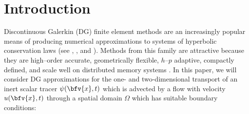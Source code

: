 \documentclass{ametsoc}
\begin{document}

\section{Introduction} \label{sec:intro}
Discontinuous Galerkin (DG) finite element methods are an increasingly popular means of producing numerical approximations to systems of hyperbolic conservation laws (see \cite{cockburn2001runge}, \cite{nair2005discontinuous}, and \cite{Hesthaven:2007aa}). Methods from this family are attractive because they are high--order accurate, geometrically flexible, $h$--$p$ adaptive, compactly defined, and scale well on distributed memory systems \cite{Giraldo:2002aa}. In this paper, we will consider DG approximations for the one- and two-dimensional transport of an inert scalar tracer $\psi(\bfv{x},t)$ which is advected by a flow with velocity $u(\bfv{x},t)$ through a spatial domain $\Omega$ which has suitable boundary conditions:
\end{document}
